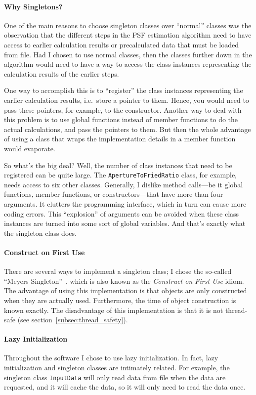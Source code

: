 \documentclass[a4paper]{article}
\begin{document}
\paragraph{Why Singletons?}
One of the main reasons to choose singleton classes over ``normal'' classes
was the observation that the different steps in the PSF estimation algorithm
need to have access to earlier calculation results or precalculated data that
must be loaded from file. Had I chosen to use normal classes, then the classes
further down in the algorithm would need to have a way to access the class
instances representing the calculation results of the earlier steps.

One way to accomplish this is to ``register'' the class instances representing
the earlier calculation results, i.e.\ store a pointer to them. Hence, you
would need to pass these pointers, for example, to the constructor. Another
way to deal with this problem is to use global functions instead of member
functions to do the actual calculations, and pass the pointers to them. But
then the whole advantage of using a class that wraps the implementation
details in a member function would evaporate.

So what's the big deal? Well, the number of class instances that need to be
registered can be quite large. The \verb|ApertureToFriedRatio| class, for
example, needs access to six other classes. Generally, I dislike method
calls---be it global functions, member functions, or constructors---that have
more than four arguments. It clutters the programming interface, which in turn
can cause more coding errors. This ``explosion'' of arguments can be avoided
when these class instances are turned into some sort of global variables. And
that's exactly what the singleton class does.

\paragraph{Construct on First Use}
There are several ways to implement a singleton class; I chose the so-called
``Meyers Singleton''~\cite[pp.~130--135]{meyers96}, which is also known as the
{\em Construct on First Use\/} idiom. The advantage of using this
implementation is that objects are only constructed when they are actually
used. Furthermore, the time of object construction is known exactly. The
disadvantage of this implementation is that it is not thread-safe (see
section~\ref{subsec:thread_safety}).

\paragraph{Lazy Initialization}
Throughout the software I chose to use lazy initialization. In fact, lazy
initialization and singleton classes are intimately related. For example, the
singleton class \verb|InputData| will only read data from file when the data
are requested, and it will cache the data, so it will only need to read the
data once.
 
\end{document}
